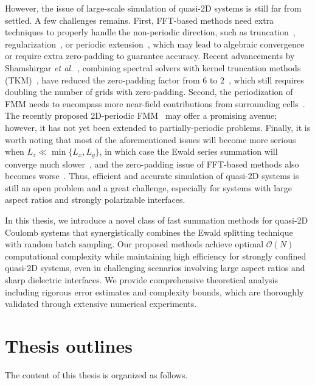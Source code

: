 However, the issue of large-scale simulation of quasi-2D systems is still far from settled.
A few challenges remains. First, FFT-based methods need extra techniques to properly handle the non-periodic direction, such as truncation~\cite{parry1975electrostatic}, regularization~\cite{nestler2015fast}, or periodic extension~\cite{lindbo2012fast}, which may lead to algebraic convergence or require extra zero-padding to guarantee accuracy. 
Recent advancements by Shamshirgar \emph{et al.}~\cite{shamshirgar2021fast}, combining spectral solvers with kernel truncation methods (TKM)~\cite{vico2016fast}, have reduced the zero-padding factor from $6$ to $2$~\cite{lindbo2012fast}, which still requires doubling the number of grids with zero-padding. 
Second, the periodization of FMM needs to encompass more near-field contributions from surrounding cells~\cite{yan2018flexibly,barnett2018unified}. The recently proposed 2D-periodic FMM~\cite{PEI2023111792} may offer a promising avenue; however, it has not yet been extended to partially-periodic problems.
Finally, it is worth noting that most of the aforementioned issues will become more serious when $L_z\ll \min\{L_x, L_y\}$, in which case the Ewald series summation will converge much slower~\cite{arnold2002electrostatics}, and the zero-padding issue of FFT-based methods also becomes worse~\cite{maxian2021fast}.
Thus, efficient and accurate simulation of quasi-2D systems is still an open problem and a great challenge, especially for systems with large aspect ratios and strongly polarizable interfaces.


In this thesis, we introduce a novel class of fast summation methods for quasi-2D Coulomb systems that synergistically combines the Ewald splitting technique with random batch sampling. 
Our proposed methods achieve optimal $\mathcal{O}(N)$ computational complexity while maintaining high efficiency for strongly confined quasi-2D systems, even in challenging scenarios involving large aspect ratios and sharp dielectric interfaces. 
We provide comprehensive theoretical analysis including rigorous error estimates and complexity bounds, which are thoroughly validated through extensive numerical experiments.

\section{Thesis outlines}

The content of this thesis is organized as follows.

